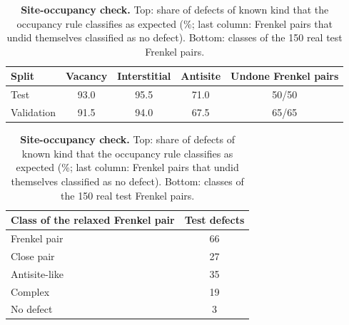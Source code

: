 \begin{table}[h]
\centering
\caption{\textbf{Site-occupancy check.} Top: share of defects of known kind that the occupancy rule classifies as expected (\%; last column: Frenkel pairs that undid themselves classified as no defect). Bottom: classes of the 150 real test Frenkel pairs.}
\label{tab:occupancy}
\footnotesize
\begin{tabular}{@{}lcccc@{}}
\toprule
Split & Vacancy & Interstitial & Antisite & Undone Frenkel pairs \\
\midrule
Test & 93.0 & 95.5 & 71.0 & 50/50 \\
Validation & 91.5 & 94.0 & 67.5 & 65/65 \\
\bottomrule
\end{tabular}

\vspace{6pt}
\begin{tabular}{@{}lc@{}}
\toprule
Class of the relaxed Frenkel pair & Test defects \\
\midrule
Frenkel pair & 66 \\
Close pair & 27 \\
Antisite-like & 35 \\
Complex & 19 \\
No defect & 3 \\
\bottomrule
\end{tabular}
\end{table}
